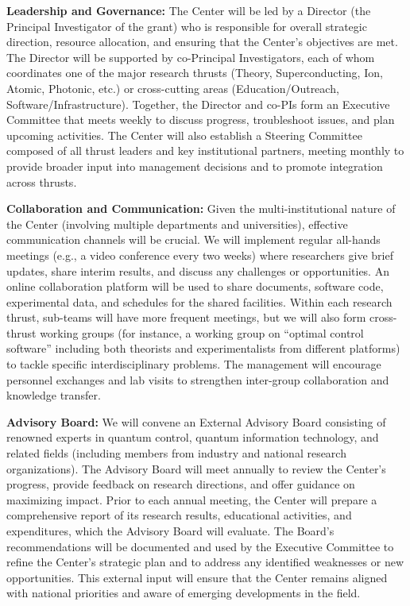 \documentclass[11pt]{article}
\begin{document}
\textbf{Leadership and Governance:} The Center will be led by a Director (the Principal Investigator of the grant) who is responsible for overall strategic direction, resource allocation, and ensuring that the Center's objectives are met. The Director will be supported by co-Principal Investigators, each of whom coordinates one of the major research thrusts (Theory, Superconducting, Ion, Atomic, Photonic, etc.) or cross-cutting areas (Education/Outreach, Software/Infrastructure). Together, the Director and co-PIs form an Executive Committee that meets weekly to discuss progress, troubleshoot issues, and plan upcoming activities. The Center will also establish a Steering Committee composed of all thrust leaders and key institutional partners, meeting monthly to provide broader input into management decisions and to promote integration across thrusts.

\textbf{Collaboration and Communication:} Given the multi-institutional nature of the Center (involving multiple departments and universities), effective communication channels will be crucial. We will implement regular all-hands meetings (e.g., a video conference every two weeks) where researchers give brief updates, share interim results, and discuss any challenges or opportunities. An online collaboration platform will be used to share documents, software code, experimental data, and schedules for the shared facilities. Within each research thrust, sub-teams will have more frequent meetings, but we will also form cross-thrust working groups (for instance, a working group on “optimal control software” including both theorists and experimentalists from different platforms) to tackle specific interdisciplinary problems. The management will encourage personnel exchanges and lab visits to strengthen inter-group collaboration and knowledge transfer.

\textbf{Advisory Board:} We will convene an External Advisory Board consisting of renowned experts in quantum control, quantum information technology, and related fields (including members from industry and national research organizations). The Advisory Board will meet annually to review the Center's progress, provide feedback on research directions, and offer guidance on maximizing impact. Prior to each annual meeting, the Center will prepare a comprehensive report of its research results, educational activities, and expenditures, which the Advisory Board will evaluate. The Board’s recommendations will be documented and used by the Executive Committee to refine the Center’s strategic plan and to address any identified weaknesses or new opportunities. This external input will ensure that the Center remains aligned with national priorities and aware of emerging developments in the field.
\end{document}
